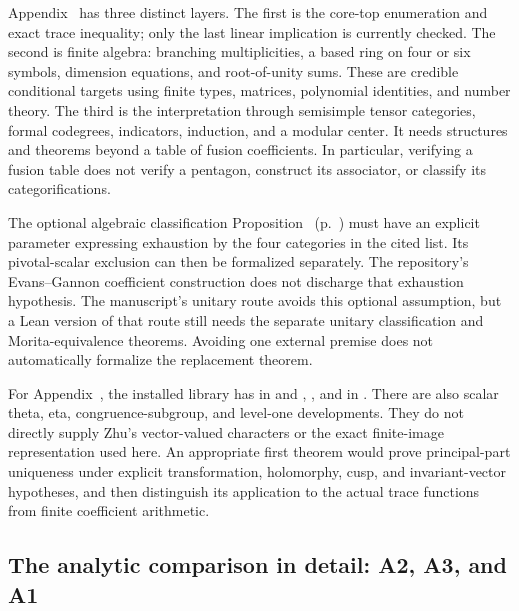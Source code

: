 Appendix~ has three distinct layers. The first is the core-top
enumeration and exact trace inequality; only the last linear implication
is currently checked. The second is finite algebra: branching
multiplicities, a based ring on four or six symbols, dimension equations,
and root-of-unity sums. These are credible conditional targets using
finite types, matrices, polynomial identities, and number theory.
The third is the interpretation through semisimple tensor categories,
formal codegrees, indicators, induction, and a modular center. It needs
structures and theorems beyond a table of fusion coefficients. In
particular, verifying a fusion table does not verify a pentagon,
construct its associator, or classify its categorifications.

The optional algebraic classification
Proposition~
(p.~) must have an explicit
parameter expressing exhaustion by the four categories in the cited
list. Its pivotal-scalar exclusion can then be formalized separately.
The repository's Evans--Gannon coefficient construction does not
discharge that exhaustion hypothesis. The manuscript's unitary route
avoids this optional assumption, but a Lean version of that route still
needs the separate unitary classification and Morita-equivalence
theorems. Avoiding one external premise does not automatically formalize
the replacement theorem.

For Appendix~, the installed library has  in
 and
,
, and
 in
.
There are also scalar theta, eta, congruence-subgroup, and level-one
developments. They do not directly supply Zhu's vector-valued
characters or the exact finite-image representation used here.
An appropriate first theorem would prove principal-part uniqueness
under explicit transformation, holomorphy, cusp, and invariant-vector
hypotheses, and then distinguish its application to the actual trace
functions from finite coefficient arithmetic.

\subsection{The analytic comparison in detail: A2, A3, and A1}

